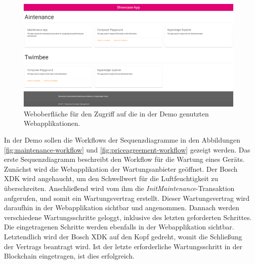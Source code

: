\begin{figure}[!htbp]
    \centering
      \includegraphics[width=1.0\textwidth,angle=0]{images/showcase-app}
       \caption{Weboberfläche für den Zugriff auf die in der Demo genutzten Webapplikationen.}
      \label{fig:showcase-app}
\end{figure}

In der Demo sollen die Workflows der Sequenzdiagramme in den Abbildungen \ref{fig:maintenance-workflow} und \ref{fig:priceagreement-workflow} gezeigt werden. Das erste Sequenzdiagramm beschreibt den Workflow für die Wartung eines Geräts. Zunächst wird die Webapplikation der Wartungsanbieter geöffnet. Der Bosch XDK wird angehaucht, um den Schwellwert für die Luftfeuchtigkeit zu überschreiten. Anschließend wird vom ihm die \textit{InitMaintenance}-Transaktion aufgerufen, und somit ein Wartungsvertrag erstellt. Dieser Wartungsvertrag wird daraufhin in der Webapplikation sichtbar und angenommen. Dannach werden verschiedene Wartungsschritte geloggt, inklusive des letzten geforderten Schrittes. Die eingetragenen Schritte werden ebenfalls in der Webapplikation sichtbar. Letztendlich wird der Bosch XDK auf den Kopf gedreht, womit die Schließung der Vertrags beantragt wird. Ist der letzte erforderliche Wartungsschritt in der Blockchain eingetragen, ist dies erfolgreich.


